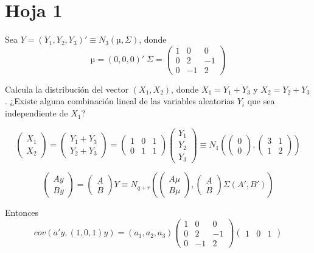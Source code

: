 \section{Hoja 1}

\begin{problem}[1]
Sea $Y = (Y_1,Y_2,Y_3)' ≡ N_3(µ,Σ)$, donde \[µ = (0,0,0)'\;
Σ =\begin{pmatrix}
1&0&0\\
0&2&−1\\
0&−1&2
\end{pmatrix}
\]


\ppart  Calcula la distribución del vector $(X_1,X_2)$, donde $X_1 = Y_1 + Y_3$ y $X_2 = Y_2 + Y_3$.
\ppart ¿Existe alguna combinación lineal de las variables aleatorias $Y_i$ que sea independiente de $X_1$?

\solution

\spart 
\[
\begin{pmatrix}X_1 \\ X_2 \end{pmatrix} = \begin{pmatrix} Y_1 + Y_3 \\ Y_2 + Y_3 \end{pmatrix} = \begin{pmatrix} 1&0&1\\0&1&1 \end{pmatrix} \begin{pmatrix} Y_1\\Y_2\\Y_3 \end{pmatrix} \equiv N_1\left( \begin{pmatrix}0\\0 \end{pmatrix},\begin{pmatrix}3&1\\1&2\end{pmatrix} \right)
\]

\spart 
\[
\begin{pmatrix} Ay\\By \end{pmatrix} = \begin{pmatrix} A\\B \end{pmatrix} Y \equiv N_{q+r} \left( \begin{pmatrix} Aμ\\Bμ \end{pmatrix},\begin{pmatrix} A\\B \end{pmatrix} Σ(A',B') \right)
\]

Entonces \[cov\left(a'y,(1,0,1)y\right) = (a_1,a_2,a_3) \begin{pmatrix} 1&0&0\\0&2&-1\\0&-1&2\end{pmatrix} \begin{pmatrix} 1&0&1 \end{pmatrix}\]

\end{problem}


